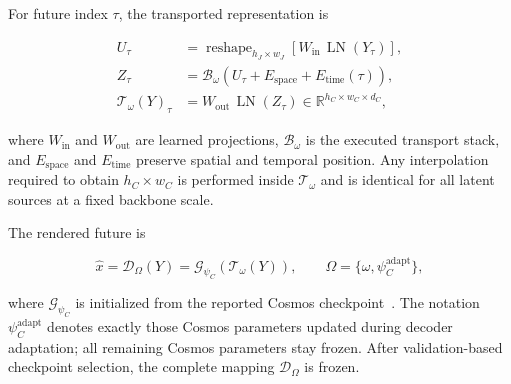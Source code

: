 For future index \(\tau\), the transported representation is

\begin{equation*}
\begin{aligned}
U_\tau
&=
\operatorname{reshape}_{h_J\times w_J}
\left[
W_{\mathrm{in}}\,
\operatorname{LN}(Y_\tau)
\right],                                                     \\
Z_\tau
&=
\mathcal B_\omega
\left(
U_\tau
+
E_{\mathrm{space}}
+
E_{\mathrm{time}}(\tau)
\right),                                                     \\
\mathcal T_\omega(Y)_\tau
&=
W_{\mathrm{out}}\,
\operatorname{LN}(Z_\tau)
\in
\mathbb{R}^{h_C\times w_C\times d_C},
\end{aligned}
\end{equation*}

where \(W_{\mathrm{in}}\) and \(W_{\mathrm{out}}\) are learned
projections, \(\mathcal B_\omega\) is the executed transport stack,
and \(E_{\mathrm{space}}\) and \(E_{\mathrm{time}}\) preserve spatial
and temporal position. Any interpolation required to obtain
\(h_C\times w_C\) is performed inside \(\mathcal T_\omega\) and is
identical for all latent sources at a fixed backbone scale.

The rendered future is

\begin{equation*}
\widehat x
=
\mathcal D_\Omega(Y)
=
\mathcal G_{\psi_C}
\left(
\mathcal T_\omega(Y)
\right),
\qquad
\Omega=\{\omega,\psi_C^{\mathrm{adapt}}\},
\end{equation*}

where \(\mathcal G_{\psi_C}\) is initialized from the reported
Cosmos checkpoint~\cite{nvidia2025cosmos}. The notation
\(\psi_C^{\mathrm{adapt}}\) denotes exactly those Cosmos parameters
updated during decoder adaptation; all remaining Cosmos parameters
stay frozen. After validation-based checkpoint selection, the complete
mapping \(\mathcal D_\Omega\) is frozen.

